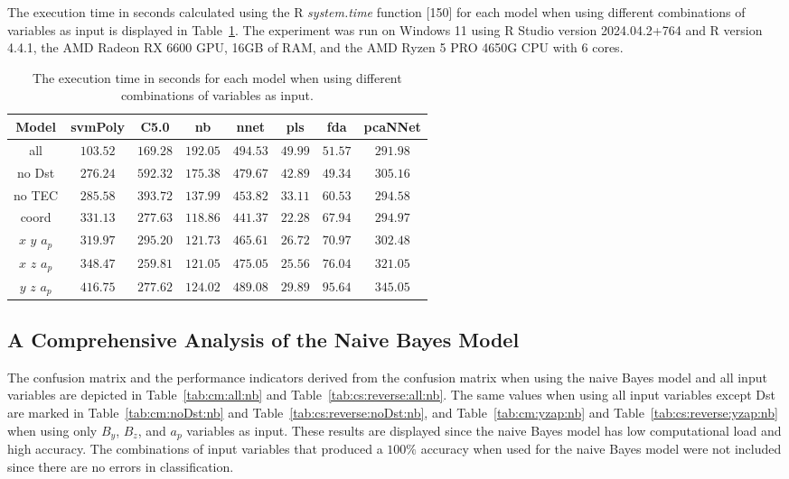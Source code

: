 \documentclass[preprint,12pt]{elsarticle}
\begin{document}
The execution time in seconds calculated using the R \textit{system.time} function [150] for each model when using different combinations of variables as input is displayed in Table~\ref{tab:time:total}. The experiment was run on Windows 11 using R Studio version 2024.04.2+764 and R version 4.4.1, the AMD Radeon RX 6600 GPU, 16GB of RAM, and the AMD Ryzen 5 PRO 4650G CPU with 6 cores.

\begin{table}[!ht]
	\centering
	\begin{tabular}{|c|c|c|c|c|c|c|c|}
		\hline
		Model & svmPoly & C5.0 & nb & nnet & pls & fda & pcaNNet \\ \hline
		all & $103.52$ & $169.28$ & $192.05$ & $494.53$ & $49.99$ & $51.57$ & $291.98$ \\ \hline
		no Dst & $276.24$ & $592.32$ & $175.38$ & $479.67$ & $42.89$ & $49.34$ & $305.16$ \\ \hline
		no TEC & $285.58$ & $393.72$ & $137.99$ & $453.82$ & $33.11$ & $60.53$ & $294.58$ \\ \hline
		coord & $331.13$ & $277.63$ & $118.86$ & $441.37$ & $22.28$ & $67.94$ & $294.97$ \\ \hline
		$x$ $y$ $a_{p}$ & $319.97$ & $295.20$ & $121.73$ & $465.61$ & $26.72$ & $70.97$ & $302.48$ \\ \hline
		$x$ $z$ $a_{p}$ & $348.47$ & $259.81$ & $121.05$ & $475.05$ & $25.56$ & $76.04$ & $321.05$ \\ \hline
		$y$ $z$ $a_{p}$ & $416.75$ & $277.62$ & $124.02$ & $489.08$ & $29.89$ & $95.64$ & $345.05$ \\ \hline
	\end{tabular}
	\caption{The execution time in seconds for each model when using different combinations of variables as input.}
	\label{tab:time:total}
\end{table}

\subsection{A Comprehensive Analysis of the Naive Bayes Model}

The confusion matrix and the performance indicators derived from the confusion matrix when using the naive Bayes model and all input variables are depicted in Table~\ref{tab:cm:all:nb} and Table~\ref{tab:cs:reverse:all:nb}. The same values when using all input variables except Dst are marked in Table~\ref{tab:cm:noDst:nb} and Table~\ref{tab:cs:reverse:noDst:nb}, and Table~\ref{tab:cm:yzap:nb} and Table~\ref{tab:cs:reverse:yzap:nb} when using only $B_{y}$, $B_{z}$, and $a_{p}$ variables as input. These results are displayed since the naive Bayes model has low computational load and high accuracy. The combinations of input variables that produced a $100\%$ accuracy when used for the naive Bayes model were not included since there are no errors in classification.
\end{document}
